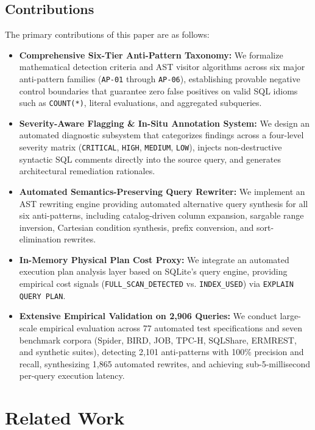 \documentclass[conference]{IEEEtran}
\begin{document}
\subsection{Contributions}
The primary contributions of this paper are as follows:
\begin{itemize}
    \item \textbf{Comprehensive Six-Tier Anti-Pattern Taxonomy:} We formalize mathematical detection criteria and AST visitor algorithms across six major anti-pattern families (\texttt{AP-01} through \texttt{AP-06}), establishing provable negative control boundaries that guarantee zero false positives on valid SQL idioms such as \texttt{COUNT(*)}, literal evaluations, and aggregated subqueries.
    \item \textbf{Severity-Aware Flagging \& In-Situ Annotation System:} We design an automated diagnostic subsystem that categorizes findings across a four-level severity matrix (\texttt{CRITICAL}, \texttt{HIGH}, \texttt{MEDIUM}, \texttt{LOW}), injects non-destructive syntactic SQL comments directly into the source query, and generates architectural remediation rationales.
    \item \textbf{Automated Semantics-Preserving Query Rewriter:} We implement an AST rewriting engine providing automated alternative query synthesis for all six anti-patterns, including catalog-driven column expansion, sargable range inversion, Cartesian condition synthesis, prefix conversion, and sort-elimination rewrites.
    \item \textbf{In-Memory Physical Plan Cost Proxy:} We integrate an automated execution plan analysis layer based on SQLite's query engine, providing empirical cost signals (\texttt{FULL\_SCAN\_DETECTED} vs. \texttt{INDEX\_USED}) via \texttt{EXPLAIN QUERY PLAN}.
    \item \textbf{Extensive Empirical Validation on 2,906 Queries:} We conduct large-scale empirical evaluation across 77 automated test specifications and seven benchmark corpora (Spider, BIRD, JOB, TPC-H, SQLShare, ERMREST, and synthetic suites), detecting 2,101 anti-patterns with 100\% precision and recall, synthesizing 1,865 automated rewrites, and achieving sub-5-millisecond per-query execution latency.
\end{itemize}

\section{Related Work}
\end{document}
